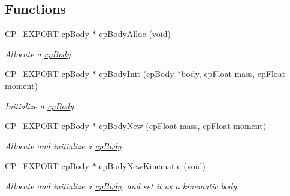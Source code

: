 \subsection*{Functions}
\begin{DoxyCompactItemize}
\item 
\mbox{\label{group__cpBody_gac13366d3aa26414dd4417bd93f93caa5}} 
C\+P\+\_\+\+E\+X\+P\+O\+RT \hyperlink{structcpBody}{cp\+Body} $\ast$ \hyperlink{group__cpBody_gac13366d3aa26414dd4417bd93f93caa5}{cp\+Body\+Alloc} (void)
\begin{DoxyCompactList}\small\item\em Allocate a \hyperlink{structcpBody}{cp\+Body}. \end{DoxyCompactList}\item 
\mbox{\label{group__cpBody_ga65beaaef6011cf495bc12af59814fd8c}} 
C\+P\+\_\+\+E\+X\+P\+O\+RT \hyperlink{structcpBody}{cp\+Body} $\ast$ \hyperlink{group__cpBody_ga65beaaef6011cf495bc12af59814fd8c}{cp\+Body\+Init} (\hyperlink{structcpBody}{cp\+Body} $\ast$body, cp\+Float mass, cp\+Float moment)
\begin{DoxyCompactList}\small\item\em Initialize a \hyperlink{structcpBody}{cp\+Body}. \end{DoxyCompactList}\item 
\mbox{\label{group__cpBody_gada270d07ce46d54c1dfd989d2d56d91d}} 
C\+P\+\_\+\+E\+X\+P\+O\+RT \hyperlink{structcpBody}{cp\+Body} $\ast$ \hyperlink{group__cpBody_gada270d07ce46d54c1dfd989d2d56d91d}{cp\+Body\+New} (cp\+Float mass, cp\+Float moment)
\begin{DoxyCompactList}\small\item\em Allocate and initialize a \hyperlink{structcpBody}{cp\+Body}. \end{DoxyCompactList}\item 
\mbox{\label{group__cpBody_ga215bada841a2ebb5f6e32f2964427d67}} 
C\+P\+\_\+\+E\+X\+P\+O\+RT \hyperlink{structcpBody}{cp\+Body} $\ast$ \hyperlink{group__cpBody_ga215bada841a2ebb5f6e32f2964427d67}{cp\+Body\+New\+Kinematic} (void)
\begin{DoxyCompactList}\small\item\em Allocate and initialize a \hyperlink{structcpBody}{cp\+Body}, and set it as a kinematic body. \end{DoxyCompactList}\item 

\end{DoxyCompactItemize}
